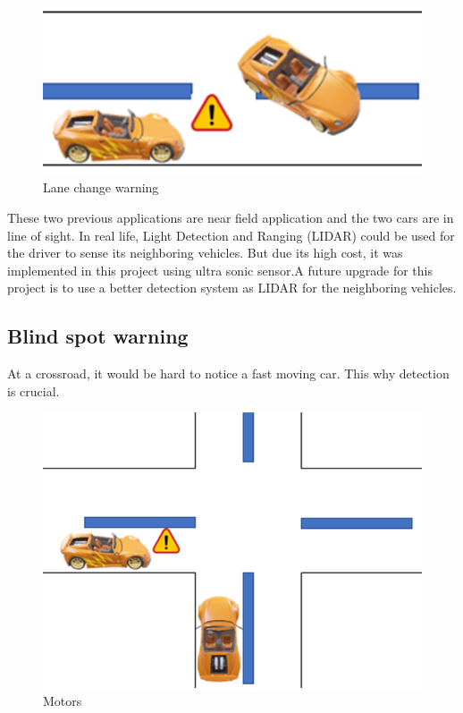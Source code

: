 \begin{figure}[h]
    \centering
    \includegraphics[scale=.7]{figure10/2.png}
    \caption{Lane change warning}
\end{figure}

These two previous applications are near field application and the two cars are in line of sight. In real life, Light Detection and Ranging (LIDAR) could be used for the driver to sense its neighboring vehicles. But due its high cost, it was implemented in this project using ultra sonic sensor.A future upgrade for this project is to use a better detection system as LIDAR for the neighboring vehicles.

\subsection{Blind spot warning}

At a crossroad, it would be hard to notice a fast moving car. This why detection is crucial.

\begin{figure}[h]
    \centering
    \includegraphics[scale=.5]{figure10/3.png}
    \caption{Motors}
    \label{fig:motors}
\end{figure}

